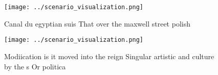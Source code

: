 \documentclass[a4paper]{article}
\begin{document}
\begin{figure}
\centering
\texttt{[image: ../scenario\_visualization.png]}
\caption{Canal du egyptian suis That over the maxwell street polish 
}
\end{figure}
 
\begin{figure}
\centering
\texttt{[image: ../scenario\_visualization.png]}
\caption{Modiication is it moved into the reign Singular artistic and culture by the s Or politica
}
\end{figure}
 
\end{document}
